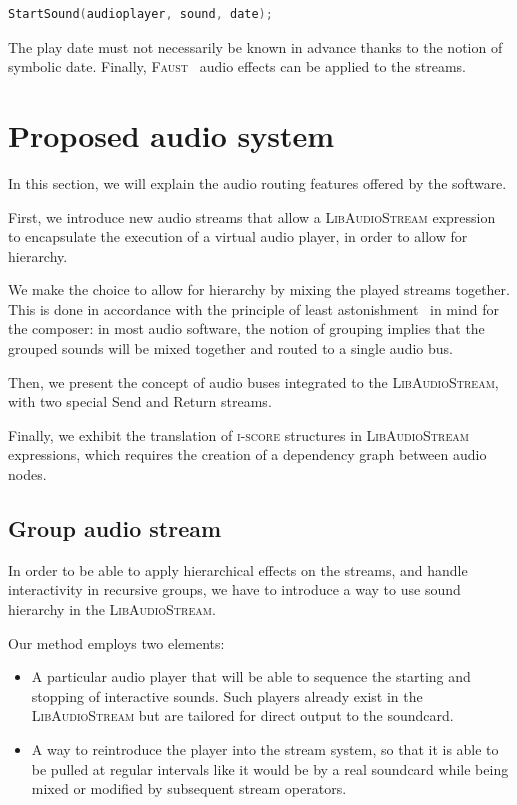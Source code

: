 \documentclass{article}
\newcommand*{\LibAudioStream}{\textsc{LibAudioStream}\xspace}
\newcommand*{\iscore}{\textsc{i-score}\xspace}
\newcommand*{\faust}{\textsc{Faust}\xspace}
\begin{document}
\begin{lstlisting}[language=C++,columns=fullflexible,basicstyle=\ttfamily]
StartSound(audioplayer, sound, date);
\end{lstlisting}

The play date must not necessarily be known in advance thanks to the notion of symbolic date.
Finally, \faust~\cite{orlarey2009faust} audio effects can be applied to the streams.

\section{Proposed audio system}
In this section, we will explain the audio routing 
features offered by the software.

First, we introduce new audio streams that allow a \LibAudioStream
expression to encapsulate the execution of a virtual audio player, 
in order to allow for hierarchy.

We make the choice to allow for hierarchy by mixing the played streams together.
This is done in accordance with the principle of least astonishment~\cite{seebach2001cranky} in mind for the composer: 
in most audio software, the notion of grouping implies that the grouped sounds will be mixed 
together and routed to a single audio bus.

Then, we present the concept of audio buses integrated to the \LibAudioStream,
with two special Send and Return streams.

Finally, we exhibit the translation of \iscore structures in \LibAudioStream expressions, 
which requires the creation of a dependency graph between audio nodes.

\subsection{Group audio stream}
In order to be able to apply hierarchical effects on the streams, 
and handle interactivity in recursive groups, we have to introduce a way to use sound hierarchy in the \LibAudioStream.

Our method employs two elements: 
\begin{itemize}
	\item A particular audio player that will be able to sequence the starting and stopping 
	of interactive sounds.
	Such players already exist in the \LibAudioStream but are tailored for direct output to
	the soundcard.
	\item A way to reintroduce the player into the stream system, so that it 
	is able to be pulled at regular intervals like it would be by a real soundcard while being mixed or modified by subsequent stream operators.
\end{itemize}
\end{document}
